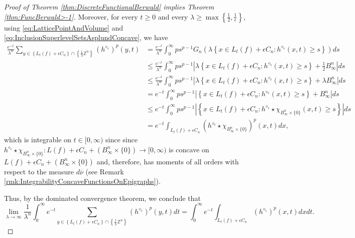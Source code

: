 \documentclass{amsart}
\newcommand{\Z}{\mathbb Z}
\theoremstyle{remark}
\theoremstyle{definition}
\numberwithin{equation}{section}
\begin{document}
\begin{proof}[Proof of Theorem \ref{thm:DiscreteFunctionalBerwald} implies Theorem \ref{thm:FuncBerwald>-1}]
Moreover, for every $t\geq0$ and every $\lambda\geq\max\left\{\frac{1}{2},\frac{1}{\epsilon}\right\}$, using \eqref{eq:LatticePointAndVolume} and \eqref{eq:InclusionSuperlevelSetsAsplundConcave}, we have
\begin{align*}
\frac{e^{-t}}{\lambda^n} \sum_{y \in \left\{ L_t(f) +\epsilon C_n \right\} \cap \left\{ \frac{1}{\lambda} \Z^n \right\}} (h^{\diamond_{\epsilon}})^p (y,t) &= \frac{e^{-t}}{\lambda^n} \int_0^{\infty} p s^{p-1} G_n \left( \lambda \left\{ x \in L_t(f)+\epsilon C_n : h^{\diamond_{\epsilon}} (x,t) \geq s \right\}  \right) ds \\
& \leq  \frac{e^{-t}}{\lambda^n} \int_0^{\infty} p s^{p-1}  \left| \lambda \left\{ x \in L_t(f)+\epsilon C_n : h^{\diamond_{\epsilon}} (x,t) \geq s \right\} + \frac{1}{2} B_{\infty}^n \right| ds \\
&\leq \frac{e^{-t}}{\lambda^n} \int_0^{\infty} p s^{p-1}  \left| \lambda \left\{ x \in L_t(f)+\epsilon C_n : h^{\diamond_{\epsilon}} (x,t) \geq s \right\} + \lambda B_{\infty}^n \right| ds \\
&= e^{-t} \int_0^{\infty} p s^{p-1}  \left|  \left\{ x \in L_t(f)+\epsilon C_n : h^{\diamond_{\epsilon}} (x,t) \geq s \right\} + B_{\infty}^n \right| ds \\
&\leq e^{-t} \int_0^{\infty} p s^{p-1}  \left|  \left\{ x \in L_t(f)+\epsilon C_n : h^{\diamond_{\epsilon}} \star \chi_{B_{\infty}^n\times\{0\}} (x,t) \geq s \right\}  \right| ds \\
&= e^{-t} \int_{L_t(f)+\epsilon C_n} (h^{\diamond_{\epsilon}} \star \chi_{B_{\infty}^n\times\{0\}})^p (x,t)dx,
\end{align*}
which is integrable on $t\in [0, \infty)$ since since $h^{\diamond_{\epsilon}} \star \chi_{B_{\infty}^n\times\{0\}}:L(f)+\epsilon C_n+(B_\infty^n\times\{0\})\to[0,\infty)$ is concave on $L(f)+\epsilon C_n+(B_\infty^n\times\{0\})$ and, therefore, has moments of all orders with respect to the measure $d\overline{\nu}$ (see Remark \ref{rmk:IntegrabilityConcaveFunctionsOnEpigraphs}).

Thus, by the dominated convergence theorem, we conclude that
\begin{equation} \label{h_diamond}
\lim_{\lambda \to \infty} \frac{1}{\lambda^n} \int_0^{\infty} e^{-t} \sum_{y \in \left\{ L_t(f) +\epsilon C_n \right\} \cap \left\{ \frac{1}{\lambda} \Z^n \right\}} (h^{\diamond_{\epsilon}})^p(y,t) dt = \int_0^{\infty} e^{-t} \int_{L_t(f) + \epsilon C_n} (h^{\diamond_{\epsilon}})^p (x,t) dx dt.
\end{equation}


\end{proof}
\end{document}
